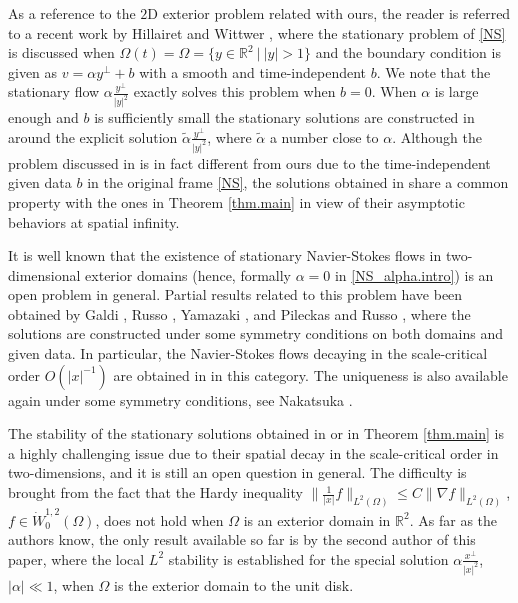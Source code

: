 \documentclass[11pt,a4paper]{article}
\newcommand{\R}{\mathbb{R}}
\begin{document}
As a reference to the $2$D exterior problem related with ours, the reader is referred to a recent work by Hillairet and Wittwer \cite{HW}, where the stationary problem of \eqref{NS} is discussed when $\Omega (t) = \Omega=\{y\in \R^2~|~|y|>1\}$ and the boundary condition is given as $v=\alpha y^\bot + b$ with a smooth and time-independent $b$. 
We note that the stationary flow $\alpha \frac{y^\bot}{|y|^2}$ exactly solves this problem when $b=0$.
When $\alpha$ is large enough and $b$ is sufficiently small the stationary solutions are constructed  in \cite{HW} around the explicit solution $\tilde \alpha \frac{y^\bot}{|y|^2}$, where $\tilde \alpha$ a number  close to $\alpha$. Although the problem discussed in \cite{HW} is in fact different from ours due to the time-independent given data $b$ in the original frame \eqref{NS}, the solutions obtained in \cite{HW} share a common property with the ones in Theorem \ref{thm.main} in view of their asymptotic behaviors at spatial infinity.

It is well known that the existence of stationary Navier-Stokes flows in two-dimensional exterior domains  (hence, formally $\alpha=0$ in \eqref{NS_alpha.intro}) is an open problem in general. 
Partial results related to this problem have been obtained by 
Galdi \cite{G2}, Russo \cite{R}, Yamazaki \cite{Y}, and Pileckas and Russo \cite{PR},
where the solutions are constructed under some symmetry conditions on both domains and given data.
In particular, the Navier-Stokes flows decaying in the scale-critical order $O(|x|^{-1})$ are obtained in \cite{Y} in this category. The uniqueness is also available again under some symmetry conditions, see Nakatsuka \cite{N}.


The stability of the stationary solutions obtained in \cite{Y,HW} or in Theorem \ref{thm.main} is a highly challenging issue due to their spatial decay in the scale-critical order in two-dimensions, 
and it is still an open question in general. The difficulty is brought from the fact that the Hardy inequality 
$\| \frac{1}{|x|} f\|_{L^2 (\Omega)} \leq C \| \nabla f \|_{L^2(\Omega)}$, $f\in \dot{W}_0^{1,2}(\Omega)$, 
does not hold when $\Omega$ is an exterior domain in $\R^2$.
As far as the authors know, the only result available so far is \cite{M} by the second author of this paper,
where the local $L^2$ stability is established for the special solution $\alpha \frac{x^\bot}{|x|^2}$, $|\alpha|\ll 1$, when $\Omega$ is the exterior domain to the unit disk.
 
\end{document}
